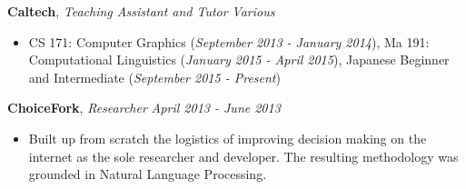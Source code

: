 \documentclass[9pt]{article}
\newenvironment{changemargin}[2]{%
  \begin{list}{}{%
    \setlength{\topsep}{0pt}%
    \setlength{\leftmargin}{#1}%
    \setlength{\rightmargin}{#2}%
    \setlength{\listparindent}{\parindent}%
    \setlength{\itemindent}{\parindent}%
    \setlength{\parsep}{\parskip}%
  }%
  \item[]}{\end{list}
}
\newenvironment{body} {
	\vspace*{-16pt}
	\begin{changemargin}{-0.25in}{-0.5in}
  }	
	{\end{changemargin}
}
\begin{document}
\begin{body}
\begin{itemize}
	\end{itemize}
	\vspace*{-1pt}
	\textbf{Caltech}, \emph{Teaching Assistant and Tutor} \hfill \emph{Various}\\
	\vspace*{-3pt}
	\begin{itemize} \itemsep -0pt %
	\item CS 171: Computer Graphics (\emph{September 2013 - January 2014}), Ma 191: Computational Linguistics (\emph{January 2015 - April 2015}), Japanese Beginner and Intermediate (\emph{September 2015 - Present})
	\end{itemize}
	\vspace*{-1pt}
	\textbf{ChoiceFork}, \emph{Researcher} \hfill \emph{April 2013 - June 2013}\\
	\vspace*{-3pt}
	\begin{itemize} \itemsep -0pt  %
		\item Built up from scratch the logistics of improving decision making on the internet as the sole researcher and developer. The resulting methodology was grounded in Natural Language Processing.
	\end{itemize}
\smallskip
	\vspace*{-3pt}
	\vspace*{-3pt}
\smallskip

	
\end{body}

\end{document}
